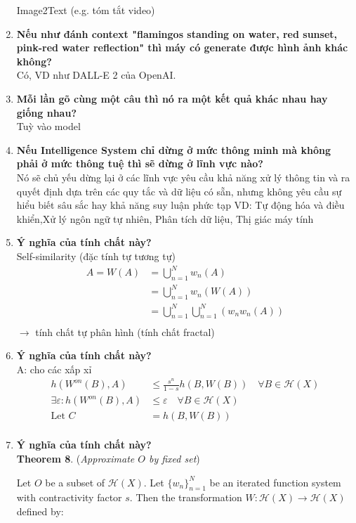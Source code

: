 \begin{enumerate}
    Image2Text (e.g. tóm tắt video)
    \item \textbf{Nếu như đánh context "flamingos standing on water, red sunset, pink-red water reflection" thì máy có generate được hình ảnh khác không?}\\
    Có, VD như DALL-E 2 của OpenAI. 
    \item \textbf{Mỗi lần gõ cùng một câu thì nó ra một kết quả khác nhau hay giống nhau?}\\
    Tuỳ vào model
    \item \textbf{Nếu Intelligence System chỉ dừng ở mức thông minh mà không phải ở mức thông tuệ thì sẽ dừng ở lĩnh vực nào?}\\
    Nó sẽ chủ yếu dừng lại ở các lĩnh vực yêu cầu khả năng xử lý thông tin và ra quyết định dựa trên các quy tắc và dữ liệu có sẵn, nhưng không yêu cầu sự hiểu biết sâu sắc hay khả năng suy luận phức tạp VD: Tự động hóa và điều khiển,Xử lý ngôn ngữ tự nhiên, Phân tích dữ liệu, Thị giác máy tính
    \item \textbf{Ý nghĩa của tính chất này?}\\
    Self-similarity (đặc tính tự tương tự)
    \begin{align*}
        A = W(A)
        &= \bigcup_{n=1}^N w_n(A)\\
        &= \bigcup_{n=1}^N w_n(W(A))\\
        &= \bigcup_{n=1}^N\bigcup_{n=1}^N (w_n w_n(A))\\
    \end{align*}
    $\rightarrow$ tính chất tự phân hình (tính chất fractal)
    \item \textbf{Ý nghĩa của tính chất này?}\\
    A: cho các xấp xỉ 
    \begin{align*}
    h(W^{on}(B), A) &\leq \frac{s^n}{1 - s} h(B, W(B)) \quad \forall B \in \mathcal{H}(X)\\
    \exists \varepsilon: h(W^{on}(B), A) &\leq \varepsilon \quad \forall B \in \mathcal{H}(X)\\
    \textrm{Let } C &= h(B, W(B))\\
    \end{align*}
    \item \textbf{Ý nghĩa của tính chất này?}\\
    \textbf{Theorem 8}. (\textit{Approximate \(O\) by fixed set})
    
    Let \(O\) be a subset of \(\mathcal{H}(X)\). Let \(\{w_n\}_{n=1}^N\) be an iterated function system with contractivity factor \(s\). Then the transformation \(W: \mathcal{H}(X) \rightarrow \mathcal{H}(X)\) defined by:
    

\end{enumerate}
